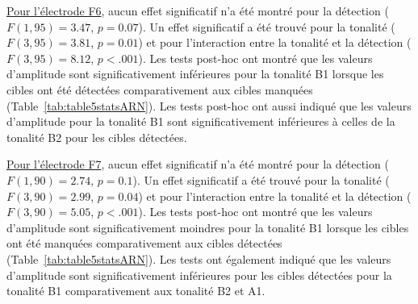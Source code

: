 \underline{Pour l'électrode F6}, aucun effet significatif n'a été montré pour la détection ($F(1,95)=3.47$, $p=0.07$). 
Un effet significatif a été trouvé pour la tonalité ($F(3,95)=3.81$, $p=0.01$) et pour l'interaction entre la tonalité et la détection ($F(3,95)=8.12$, $p<.001$). 
Les tests post-hoc ont montré que les valeurs d'amplitude sont significativement inférieures pour la tonalité B1 lorsque les cibles ont été détectées comparativement aux cibles manquées (Table~\ref{tab:table5statsARN}). 
Les tests post-hoc ont aussi indiqué que les valeurs d'amplitude pour la tonalité B1 sont significativement inférieures à celles de la tonalité B2 pour les cibles détectées. 

\underline{Pour l'électrode F7}, aucun effet significatif n'a été montré pour la détection ($F(1,90)=2.74$, $p=0.1$). 
Un effet significatif a été trouvé pour la tonalité ($F(3,90)=2.99$, $p=0.04$) et pour l'interaction entre la tonalité et la détection ($F(3,90)=5.05$, $p<.001$). 
Les tests post-hoc ont montré que les valeurs d'amplitude sont significativement moindres pour la tonalité B1 lorsque les cibles ont été manquées comparativement aux cibles détectées (Table~\ref{tab:table5statsARN}). 
Les tests ont également indiqué que les valeurs d'amplitude sont significativement inférieures pour les cibles détectées pour la tonalité B1 comparativement aux tonalité B2 et A1.   

